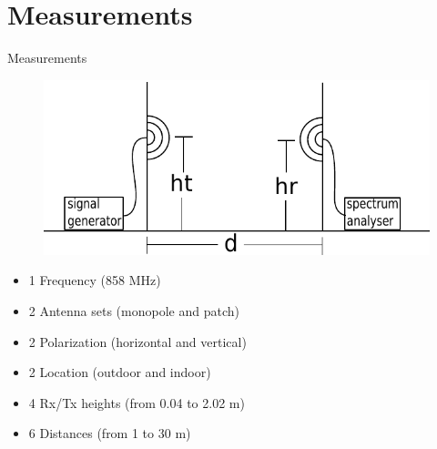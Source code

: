 \documentclass[10pt]{beamer}
\begin{document}
\section{Measurements}
\begin{frame}{Measurements}
\begin{figure}[!htbp]
	\centering
	\includegraphics[width = \columnwidth]{figures/setup.pdf}
\end{figure}

\begin{itemize}
\item 1 Frequency (858 MHz)
\item 2 Antenna sets (monopole and patch)
\item 2 Polarization (horizontal and vertical)
\item 2 Location (outdoor and indoor)
\item 4 Rx/Tx heights (from 0.04 to 2.02 m)
\item 6 Distances (from 1 to 30 m)
\end{itemize}
\end{frame}

\end{document}

